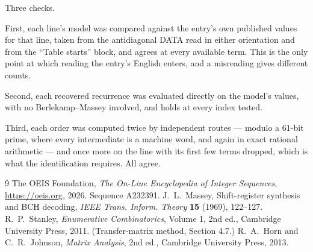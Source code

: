 \documentclass[11pt,a4paper]{article}
\theoremstyle{plain}
\theoremstyle{definition}
\begin{document}
Three checks.

First, each line's model was compared against the entry's own published values for that line,
taken from the antidiagonal DATA read in either orientation and from the ``Table starts''
block, and agrees at every available term. This is the only point at which reading the entry's
English enters, and a misreading gives different counts.

Second, each recovered recurrence was evaluated directly on the model's values, with no
Berlekamp--Massey involved, and holds at every index tested.

Third, each order was computed twice by independent routes --- modulo a $61$-bit prime, where
every intermediate is a machine word, and again in exact rational arithmetic --- and once more
on the line with its first few terms dropped, which is what the identification requires. All
agree.

\begin{thebibliography}{9}
 The OEIS Foundation, \emph{The On-Line Encyclopedia of Integer
Sequences}, \url{https://oeis.org}, 2026. Sequence A232391.
 J.~L.~Massey, Shift-register synthesis and BCH decoding, \emph{IEEE
Trans. Inform. Theory} \textbf{15} (1969), 122--127.
 R.~P.~Stanley, \emph{Enumerative Combinatorics}, Volume 1, 2nd ed.,
Cambridge University Press, 2011. (Transfer-matrix method, Section 4.7.)
 R.~A.~Horn and C.~R.~Johnson, \emph{Matrix Analysis}, 2nd ed., Cambridge
University Press, 2013.
\end{thebibliography}
\end{document}
